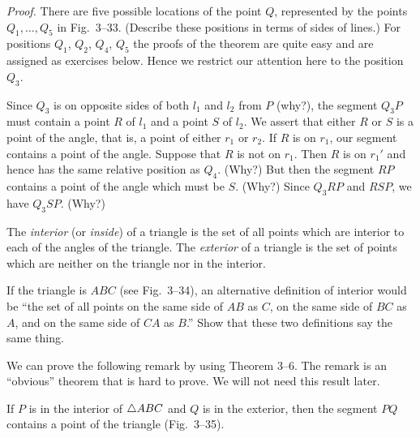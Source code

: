 \documentclass[11pt]{book}
\theoremstyle{bkplain}
\begin{document}
\noindent\emph{Proof.} There are five possible locations of the point $Q$,
represented by the points $Q_1, \ldots, Q_5$ in Fig.~3--33. (Describe these
positions in terms of sides of lines.) For positions $Q_1$, $Q_2$, $Q_4$, $Q_5$
the proofs of the theorem are quite easy and are assigned as exercises below.
Hence we restrict our attention here to the position $Q_3$.

\FIGIIITHIRTYTHREE

Since $Q_3$ is on opposite sides of both $l_1$ and $l_2$ from $P$ (why?), the
segment $Q_3P$ must contain a point $R$ of $l_1$ and a point $S$ of $l_2$. We
assert that either $R$ or $S$ is a point of the angle, that is, a point of either
$r_1$ or $r_2$. If $R$ is on $r_1$, our segment contains a point of the angle.
Suppose that $R$ is not on $r_1$. Then $R$ is on $r_1'$ and hence has the same
relative position as $Q_4$. (Why?) But then the segment $RP$ contains a point of
the angle which must be $S$. (Why?) Since $Q_3RP$ and $RSP$, we have $Q_3SP$.
(Why?)

\begin{definition}
The \emph{interior} (or \emph{inside}) of a triangle is the set of all points
which are interior to each of the angles of the triangle. The \emph{exterior} of
a triangle is the set of points which are neither on the triangle nor in the
interior.
\end{definition}

If the triangle is $ABC$ (see Fig.~3--34), an alternative definition of interior
would be ``the set of all points on the same side of $AB$ as $C$, on the same
side of $BC$ as $A$, and on the same side of $CA$ as $B$.'' Show that these two
definitions say the same thing.

We can prove the following remark by using Theorem 3--6. The remark is an
``obvious'' theorem that is hard to prove. We will not need this result later.

\begin{remark}
If $P$ is in the interior of $\triangle ABC$ and $Q$ is in the exterior, then the
segment $PQ$ contains a point of the triangle (Fig.~3--35).
\end{remark}

\FIGIIITHIRTYFOURTHIRTYFIVE
\end{document}
